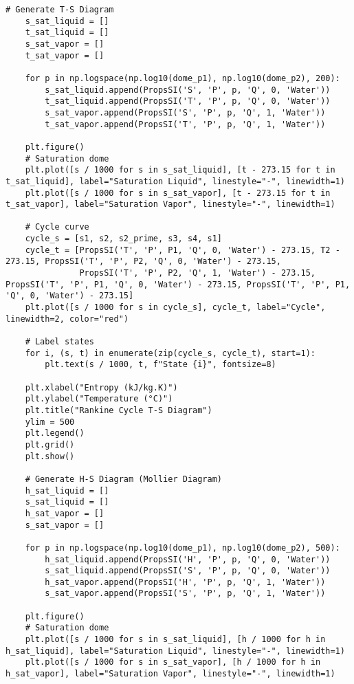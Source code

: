 \documentclass[11pt]{article}
\begin{document}
\begin{lstlisting}[style=custompython, caption=Python code for the Ideal Rankine Cycle]
    # Generate T-S Diagram
    s_sat_liquid = []
    t_sat_liquid = []
    s_sat_vapor = []
    t_sat_vapor = []

    for p in np.logspace(np.log10(dome_p1), np.log10(dome_p2), 200):
        s_sat_liquid.append(PropsSI('S', 'P', p, 'Q', 0, 'Water'))
        t_sat_liquid.append(PropsSI('T', 'P', p, 'Q', 0, 'Water'))
        s_sat_vapor.append(PropsSI('S', 'P', p, 'Q', 1, 'Water'))
        t_sat_vapor.append(PropsSI('T', 'P', p, 'Q', 1, 'Water'))

    plt.figure()
    # Saturation dome
    plt.plot([s / 1000 for s in s_sat_liquid], [t - 273.15 for t in t_sat_liquid], label="Saturation Liquid", linestyle="-", linewidth=1)
    plt.plot([s / 1000 for s in s_sat_vapor], [t - 273.15 for t in t_sat_vapor], label="Saturation Vapor", linestyle="-", linewidth=1)

    # Cycle curve
    cycle_s = [s1, s2, s2_prime, s3, s4, s1]
    cycle_t = [PropsSI('T', 'P', P1, 'Q', 0, 'Water') - 273.15, T2 - 273.15, PropsSI('T', 'P', P2, 'Q', 0, 'Water') - 273.15,
               PropsSI('T', 'P', P2, 'Q', 1, 'Water') - 273.15, PropsSI('T', 'P', P1, 'Q', 0, 'Water') - 273.15, PropsSI('T', 'P', P1, 'Q', 0, 'Water') - 273.15]
    plt.plot([s / 1000 for s in cycle_s], cycle_t, label="Cycle", linewidth=2, color="red")

    # Label states
    for i, (s, t) in enumerate(zip(cycle_s, cycle_t), start=1):
        plt.text(s / 1000, t, f"State {i}", fontsize=8)

    plt.xlabel("Entropy (kJ/kg.K)")
    plt.ylabel("Temperature (°C)")
    plt.title("Rankine Cycle T-S Diagram")
    ylim = 500
    plt.legend()
    plt.grid()
    plt.show()

    # Generate H-S Diagram (Mollier Diagram)
    h_sat_liquid = []
    s_sat_liquid = []
    h_sat_vapor = []
    s_sat_vapor = []

    for p in np.logspace(np.log10(dome_p1), np.log10(dome_p2), 500):
        h_sat_liquid.append(PropsSI('H', 'P', p, 'Q', 0, 'Water'))
        s_sat_liquid.append(PropsSI('S', 'P', p, 'Q', 0, 'Water'))
        h_sat_vapor.append(PropsSI('H', 'P', p, 'Q', 1, 'Water'))
        s_sat_vapor.append(PropsSI('S', 'P', p, 'Q', 1, 'Water'))

    plt.figure()
    # Saturation dome
    plt.plot([s / 1000 for s in s_sat_liquid], [h / 1000 for h in h_sat_liquid], label="Saturation Liquid", linestyle="-", linewidth=1)
    plt.plot([s / 1000 for s in s_sat_vapor], [h / 1000 for h in h_sat_vapor], label="Saturation Vapor", linestyle="-", linewidth=1)


\end{lstlisting}
\end{document}
